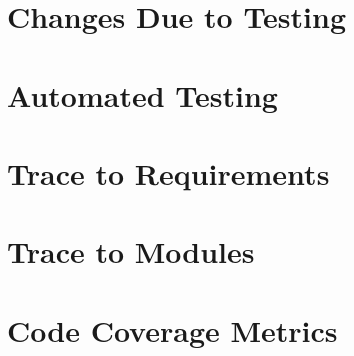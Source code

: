 \documentclass[12pt, titlepage]{article}
\begin{document}
\section{Changes Due to Testing}

\section{Automated Testing}
		
\section{Trace to Requirements}
		
\section{Trace to Modules}		

\section{Code Coverage Metrics}



 
\end{document}
